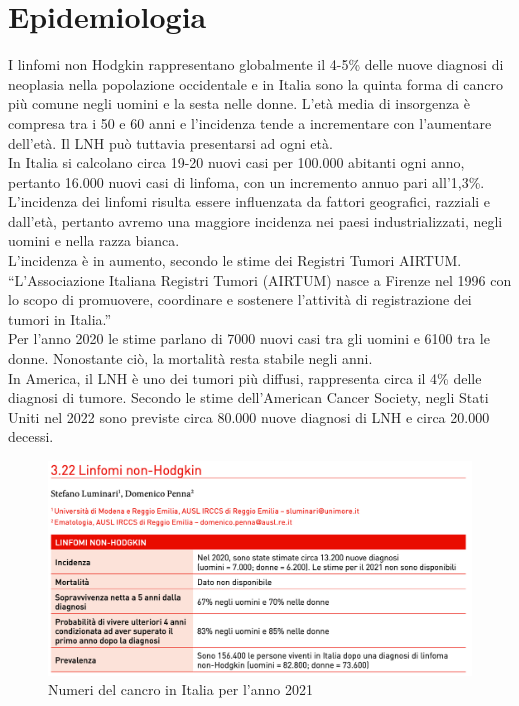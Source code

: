 \section{Epidemiologia}
I linfomi non Hodgkin rappresentano globalmente il 4-5\% delle nuove diagnosi di neoplasia nella popolazione 
occidentale e in Italia 
sono la quinta forma di cancro più comune negli uomini e la sesta nelle donne\cite{AIOM}. 
L’età media di insorgenza è compresa tra i 50 e 60 anni e l’incidenza tende a incrementare con l’aumentare dell’età. 
Il LNH può tuttavia presentarsi ad ogni età.\\ 
In Italia si calcolano circa 19-20 nuovi casi per 100.000 abitanti ogni anno, pertanto 16.000 nuovi casi di linfoma, 
con un incremento annuo pari all’1,3\%\cite{AIOM}.\\
L’incidenza dei linfomi risulta essere influenzata da fattori geografici, razziali e dall'età, 
pertanto avremo una maggiore incidenza nei paesi industrializzati, negli uomini e nella razza bianca\cite{AIOM}.\\
L’incidenza è in aumento, secondo le stime dei Registri Tumori AIRTUM. “L’Associazione Italiana Registri Tumori 
(AIRTUM) nasce a Firenze nel 1996 con lo scopo di promuovere, coordinare e sostenere l’attività di registrazione 
dei tumori in Italia\cite{AIRTUM}.”\\
Per l’anno 2020 le stime parlano di 7000 nuovi casi tra gli uomini e 6100 tra le donne. 
Nonostante ciò, la mortalità resta stabile negli anni\cite{AIRC}.\\
In America, il LNH è uno dei tumori più diffusi, rappresenta circa il 4\% delle diagnosi di tumore. 
Secondo le stime dell’American Cancer Society, negli Stati Uniti nel 2022 sono previste circa 80.000 nuove 
diagnosi di LNH e circa 20.000 decessi\cite{Americanstatistic}.\\

\begin{figure}[h]
    \begin{center}
    \includegraphics[width=0.8\columnwidth]{img/2021.png}
    \end{center}
    \caption[Numeri del cancro in Italia per l’anno 2021]{Numeri del cancro in Italia per l’anno 2021
    \cite{img4}}

\end{figure}

